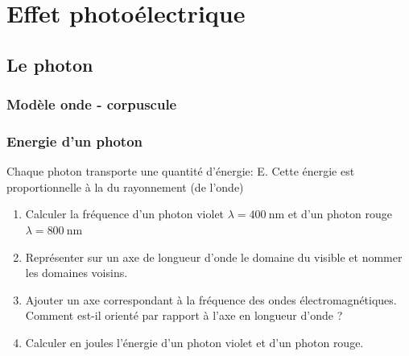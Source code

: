 \setcounter{chapter}{18}
\chapter{Effet photoélectrique}
\section{Le photon}
\subsection{Modèle onde - corpuscule}


\subsection{Energie d'un photon}

Chaque photon transporte une quantité d'énergie: E. Cette énergie est proportionnelle à la  du rayonnement (de l'onde) 


\begin{enumerate}
	\item Calculer la fréquence d'un photon violet $\lambda=\SI{400}{\nano\meter}$ et d'un photon rouge $\lambda=\SI{800}{\nano\meter}$ 
	\item Représenter sur un axe de longueur d'onde le domaine du visible et nommer les domaines voisins.
	\item Ajouter un axe correspondant à la fréquence des ondes électromagnétiques. Comment est-il orienté par rapport à l'axe en longueur d'onde ?
	\item Calculer en joules  l'énergie d'un photon violet et d'un photon rouge.
\end{enumerate}


